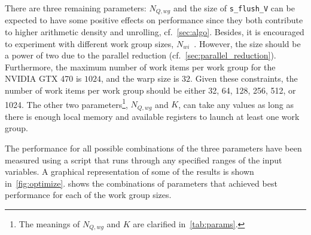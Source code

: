 \documentclass[11pt,twoside]{report}
\begin{document}
There are three remaining parameters: $N_{Q,wg}$ and the size of {\tt s\_flush\_V} can be expected to have some positive effects on performance since they both contribute to higher arithmetic density and unrolling, cf.~\cref{sec:algo}. Besides, it is encouraged to experiment with different work group sizes, $N_{wi}$~\cite{opencl.programming}. However, the size should be a power of two due to the parallel reduction (cf.~\cref{sec:parallel_reduction}). Furthermore, the maximum number of work items per work group for the NVIDIA GTX 470 is $1024$, and the warp size is $32$. Given these constraints, the number of work items per work group should be either 32, 64, 128, 256, 512, or 1024. 
The other two parameters\footnote{The meanings of $N_{Q,wg}$ and $K$  are clarified in~\cref{tab:params}.}, $N_{Q,wg}$ and $K$, can take any values as long as there is enough local memory and available registers to launch at least one work group. 

\indent The performance for all possible combinations of the three parameters have been measured using a script that runs through any specified ranges of the input variables. A graphical representation of some of the results is shown in~\cref{fig:optimize}.  shows the combinations of parameters that achieved best performance for each of the work group sizes. 
\end{document}
